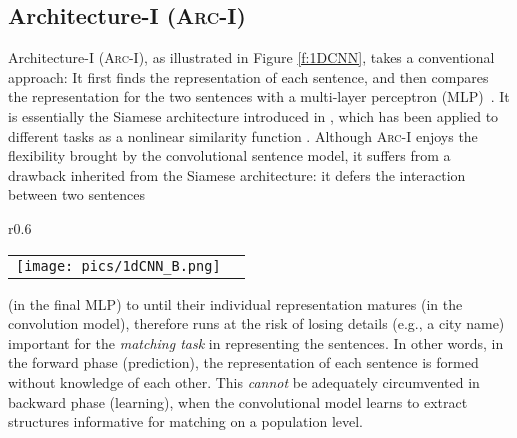 \documentclass{article} \usepackage{nips14submit_e,times}
\newcommand{\0}{\ensuremath{\mathbf{0}}}
\newcommand{\1}{\ensuremath{\mathbf{1}}}
\begin{document}
\subsection{Architecture-I (\textsc{Arc-I})} \vspace{-10pt}
Architecture-I (\textsc{Arc-I}),  as illustrated in Figure \ref{f:1DCNN}, takes a conventional approach: It first finds the representation of each sentence, and then compares the representation for the two sentences with a multi-layer perceptron (\textsc{MLP})~\cite{DeepAI}. It is essentially the Siamese architecture introduced in \cite{bordes2014semantic, cnn}, which has been applied to different tasks as a nonlinear similarity function \cite{Sun_2013_ICCV}. Although \textsc{Arc-I} enjoys the flexibility brought by the convolutional sentence model, it suffers from a drawback inherited from the Siamese architecture: it defers the interaction  between two sentences
\begin{wrapfigure}{r}{0.6\textwidth}
\begin{center}
\begin{tabular}[c]{cc}
     \texttt{[image: pics/1dCNN\_B.png]}
     \end{tabular}
\vspace{-10pt}
    \caption{Architecture-I for matching two sentences.} \vspace{-5pt}
    \label{f:1DCNN}
  \end{center}
\end{wrapfigure} (in the final MLP) to until their individual representation matures (in the convolution model), therefore runs at the risk of losing details (e.g., a city name) important for the \emph{matching task} in representing the sentences. In other words, in the forward phase (prediction), the representation of each sentence is formed without knowledge of each other. This \emph{cannot} be adequately circumvented in backward phase (learning), when the convolutional model learns to extract structures informative for matching on a population level.
\end{document}
